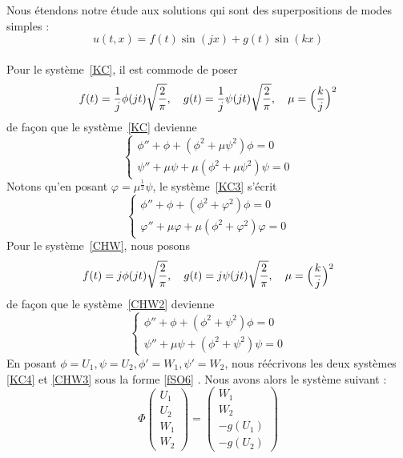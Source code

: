 \documentclass[11pt,a4paper]{article}
\begin{document}
Nous étendons notre étude aux solutions qui sont des superpositions de modes simples : 
 \begin{equation} 
 u(t,x)= f(t) \sin ( j x) + g (t) \sin ( k x )
 \end{equation} \\
 Pour le système~\eqref{KC}, il est commode de poser
\begin{equation} \label{KC2} 
f (t)= \frac {1} {j}  \phi   ( j t )  \sqrt{\frac {2} {\pi }} , \quad g (t) = \frac {1} {j}  \psi   ( j t )  \sqrt{\frac {2} {\pi }} , \quad \mu =  \Bigl( \frac {k} {j} \Bigr)^2
\end{equation} 
de façon que le système~\eqref{KC} devienne
 \begin{equation} \label{KC3} 
\begin{cases} 
\phi  '' + \phi  +    ( \phi ^2 + \mu  \psi ^2 ) \phi  =0 \\
\psi  '' + \mu \psi  +  \mu ( \phi ^2 + \mu  \psi ^2 ) \psi  =0 
\end{cases} 
\end{equation} 
Notons qu'en posant $ \varphi  = \mu ^{\frac {1} {2}} \psi $, le système~\eqref{KC3} s'écrit
 \begin{equation} \label{KC4} 
\begin{cases} 
\phi  '' + \phi  +    ( \phi ^2 +   \varphi ^2 ) \phi  =0 \\
\varphi  '' + \mu  \varphi +  \mu ( \phi ^2 +   \varphi ^2 )  \varphi =0 
\end{cases} 
\end{equation} 
Pour le système~\eqref{CHW}, nous posons
\begin{equation} \label{CHW2} 
f (t)= j \phi   ( j t ) \sqrt{\frac {2} {\pi }} , \quad g (t) = j \psi   ( j t ) \sqrt{\frac {2} {\pi }} , \quad \mu =  \Bigl( \frac {k} {j} \Bigr)^2
\end{equation} 
de façon que le système~\eqref{CHW2} devienne
 \begin{equation} \label{CHW3} 
\begin{cases} 
\phi  '' + \phi  +    ( \phi ^2 + \psi ^2 ) \phi  =0 \\
\psi  '' + \mu \psi  +  ( \phi ^2 + \psi ^2 ) \psi  =0 
\end{cases} 
\end{equation} 
En posant $\phi = U_{1}, \psi = U_{2}, \phi ' = W_{1}, \psi ' = W_{2}$, nous réécrivons les deux systèmes \eqref{KC4} et \eqref{CHW3} sous la forme \eqref{fSO6} . Nous avons alors le système suivant :
\begin{equation} \label{fSO6} 
\Phi \begin{pmatrix} U_{1}\\ U_{2} \\W_{1} \\ W_{2}  \end{pmatrix} = \begin{pmatrix} W_{1}\\ W_{2} \\ - g(U_{1})\\ -g(U_{2}) \end{pmatrix} 
\end{equation} 
\end{document}

